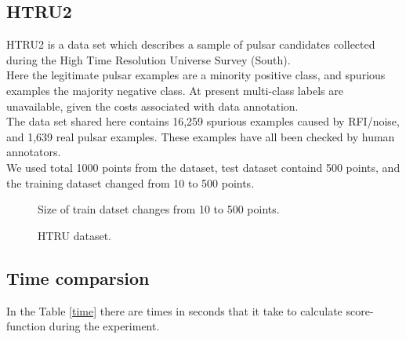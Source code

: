 \documentclass[a4paper]{article}
\begin{document}
\clearpage
\subsection{HTRU2}

HTRU2 is a data set which describes a sample of pulsar candidates collected during the High Time Resolution Universe Survey (South).
\\

Here the legitimate pulsar examples are a minority positive class, and spurious examples the majority negative class. At present multi-class labels are unavailable, given the costs associated with data annotation.
\\
The data set shared here contains 16,259 spurious examples caused by RFI/noise, and 1,639 real pulsar examples. These examples have all been checked by human annotators. 
\\ 
We used total 1000 points from the dataset, test dataset containd 500 points, and the training dataset changed from 10 to 500 points.

\begin{figure}[h]
\begin{minipage}[c]{0.49\linewidth}
 Size of train datset changes from 10 to 500 points.
\end{minipage}
\caption{HTRU dataset.}
\label{HTRU}
\end{figure}

\subsection{Time comparsion}

In the Table \ref{time} there are times in seconds that it take to calculate score-function during the experiment.
\end{document}
